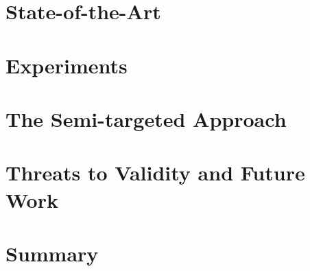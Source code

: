 \documentclass[draft,final]{vutinfth} %
\begin{document}
\chapter{State-of-the-Art}
\label{chap:attacks}


\chapter{Experiments}
\label{chap:experiments}


\chapter{The Semi-targeted Approach}
\label{chap:semi-targeted}


%

\chapter{Threats to Validity and Future Work}
\label{chap:threats}


\chapter{Summary}
\label{chap:summary}


\backmatter




\printindex

\printglossaries



\end{document}
